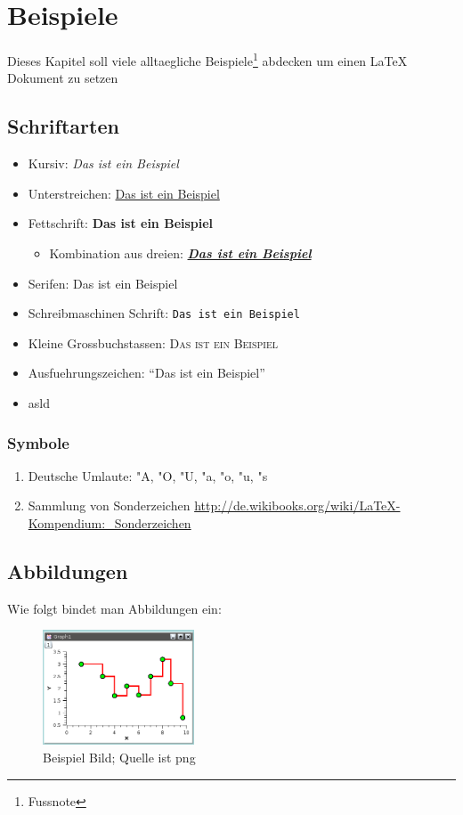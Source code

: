 \chapter{Beispiele}
\label{cha:beispiele}
	Dieses Kapitel soll viele alltaegliche Beispiele\footnote{Fussnote} abdecken um einen {\LaTeX} Dokument zu setzen

		\section{Schriftarten}
		\label{sec:schriftarten} 
			\begin{itemize}
				\item Kursiv: \emph{Das ist ein Beispiel}
				\item Unterstreichen: \underline{Das ist ein Beispiel}
				\item Fettschrift: \textbf{Das ist ein Beispiel}
				\begin{itemize} 
					\item Kombination aus dreien: \underline{\textbf{\emph{Das ist ein Beispiel}}}						\end{itemize} 
				\item Serifen: \textsf{Das ist ein Beispiel}
				\item Schreibmaschinen Schrift: \texttt{Das ist ein Beispiel}
				\item Kleine Grossbuchstassen: \textsc{Das ist ein Beispiel}
				\item Ausfuehrungszeichen: ``Das ist ein Beispiel''
				\item asld
			\end{itemize}
			
		
			\subsection{Symbole}
				\begin{enumerate}
				\item Deutsche Umlaute: "A, "O, "U, "a, "o, "u, "s
				\item Sammlung von Sonderzeichen \url{http://de.wikibooks.org/wiki/LaTeX-Kompendium:_Sonderzeichen}
				\end{enumerate}
				

	\section{Abbildungen}
		Wie folgt bindet man Abbildungen ein:
		\begin{figure}[htb]
		 \centering
		 \includegraphics[width=0.4\textwidth,angle=0]{media/beispiel}
 		\caption{Beispiel Bild; Quelle ist png}
		\label{fig:beispiel}
		\end{figure}
	
